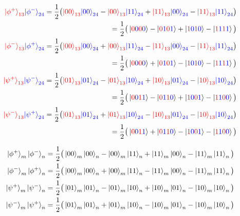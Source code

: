 \documentclass[a4paper,11pt]{article}
\newcommand{\rc}{\textcolor{red}}
\newcommand{\bc}{\textcolor{blue}}
\begin{document}
\begin{align*}
\rc{\ket{\phi^+}_{13}} \bc{\ket{\phi^-}_{24}} = \dfrac{1}{2} \big(\rc{\ket{00}_{13}} \bc{\ket{00}_{24}} - \rc{\ket{00}_{13}} \bc{\ket{11}_{24}} 
+ \rc{\ket{11}_{13}} \bc{\ket{00}_{24}} - \rc{\ket{11}_{13}} \bc{\ket{11}_{24}} \big) \nonumber \\
= \dfrac{1}{2} \big(\ket{\rc{0}\bc{0}\rc{0}\bc{0}} - \ket{\rc{0}\bc{1}\rc{0}\bc{1}} + \ket{\rc{1}\bc{0}\rc{1}\bc{0}} - \ket{\rc{1}\bc{1}\rc{1}\bc{1}} \big) \nonumber \\
\rc{\ket{\phi^-}_{13}} \bc{\ket{\phi^+}_{24}} = \dfrac{1}{2} \big(\rc{\ket{00}_{13}} \bc{\ket{00}_{24}} + \rc{\ket{00}_{13}} \bc{\ket{11}_{24}} 
- \rc{\ket{11}_{13}} \bc{\ket{00}_{24}} - \rc{\ket{11}_{13}} \bc{\ket{11}_{24}} \big) \nonumber \\
= \dfrac{1}{2} \big(\ket{\rc{0}\bc{0}\rc{0}\bc{0}} + \ket{\rc{0}\bc{1}\rc{0}\bc{1}} - \ket{\rc{1}\bc{0}\rc{1}\bc{0}} - \ket{\rc{1}\bc{1}\rc{1}\bc{1}} \big) \nonumber \\
\rc{\ket{\psi^+}_{13}} \bc{\ket{\psi^-}_{24}} = \dfrac{1}{2} \big(\rc{\ket{01}_{13}} \bc{\ket{01}_{24}} - \rc{\ket{01}_{13}} \bc{\ket{10}_{24}} 
+ \rc{\ket{10}_{13}} \bc{\ket{01}_{24}} - \rc{\ket{10}_{13}} \bc{\ket{10}_{24}} \big) \nonumber \\
= \dfrac{1}{2} \big(\ket{\rc{0}\bc{0}\rc{1}\bc{1}} - \ket{\rc{0}\bc{1}\rc{1}\bc{0}} + \ket{\rc{1}\bc{0}\rc{0}\bc{1}} - \ket{\rc{1}\bc{1}\rc{0}\bc{0}} \big) \nonumber \\
\rc{\ket{\psi^-}_{13}} \bc{\ket{\psi^+}_{24}} = \dfrac{1}{2} \big(\rc{\ket{01}_{13}} \bc{\ket{01}_{24}} + \rc{\ket{01}_{13}} \bc{\ket{10}_{24}} 
- \rc{\ket{10}_{13}} \bc{\ket{01}_{24}} - \rc{\ket{10}_{13}} \bc{\ket{10}_{24}} \big) \nonumber \\
= \dfrac{1}{2} \big(\ket{\rc{0}\bc{0}\rc{1}\bc{1}} + \ket{\rc{0}\bc{1}\rc{1}\bc{0}} - \ket{\rc{1}\bc{0}\rc{0}\bc{1}} - \ket{\rc{1}\bc{1}\rc{0}\bc{0}} \big) \nonumber \\
\end{align*}


	
\begin{align*}
\ket{\phi^+}_{m} \ket{\phi^-}_{n} = \dfrac{1}{2} \big(\ket{00}_m \ket{00}_n - \ket{00}_m \ket{11}_n + \ket{11}_m \ket{00}_n - \ket{11}_m \ket{11}_n \big) \nonumber \\
\ket{\phi^-}_{m} \ket{\phi^+}_{n} = \dfrac{1}{2} \big(\ket{00}_m \ket{00}_n + \ket{00}_m \ket{11}_n - \ket{11}_m \ket{00}_n - \ket{11}_m \ket{11}_n \big) \nonumber \\
\ket{\psi^+}_{m} \ket{\psi^-}_{n} = \dfrac{1}{2} \big(\ket{01}_m \ket{01}_n - \ket{01}_m \ket{10}_n + \ket{10}_m \ket{01}_n - \ket{10}_m \ket{10}_n \big)
\nonumber \\
\ket{\psi^-}_{m} \ket{\psi^+}_{n} = \dfrac{1}{2} \big(\ket{01}_m \ket{01}_n + \ket{01}_m \ket{10}_n - \ket{10}_m \ket{01}_n - \ket{10}_m \ket{10}_n \big)
\end{align*}
\fi


\end{document}

